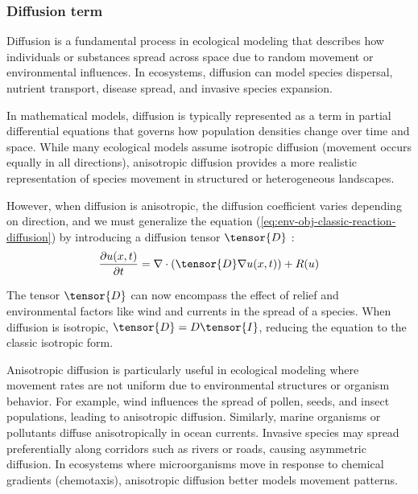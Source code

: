 \subsubsection{Diffusion term}
Diffusion is a fundamental process in ecological modeling that describes how individuals or substances spread across space due to random movement or environmental influences. In ecosystems, diffusion can model species dispersal, nutrient transport, disease spread, and invasive species expansion.

In mathematical models, diffusion is typically represented as a term in partial differential equations that governs how population densities change over time and space. While many ecological models assume isotropic diffusion (movement occurs equally in all directions), anisotropic diffusion provides a more realistic representation of species movement in structured or heterogeneous landscapes.

However, when diffusion is anisotropic, the diffusion coefficient varies depending on direction, and we must generalize the equation (\cref{eq:env-obj-classic-reaction-diffusion}) by introducing a diffusion tensor $\tensor{D}$ \cite{Ramos2024}:
\begin{align}
    \label{eq:env-obj-reaction-diffusion}
    \frac{\partial u (x, t)}{\partial t} = \nabla \cdot (\tensor{D} \nabla u(x, t)) + R(u)
\end{align}

The tensor $\tensor{D}$ can now encompass the effect of relief and environmental factors like wind and currents in the spread of a species. When diffusion is isotropic, $\tensor{D} = D\tensor{I}$, reducing the equation to the classic isotropic form.

Anisotropic diffusion is particularly useful in ecological modeling where movement rates are not uniform due to environmental structures or organism behavior. For example, wind influences the spread of pollen, seeds, and insect populations, leading to anisotropic diffusion. Similarly, marine organisms or pollutants diffuse anisotropically in ocean currents.
Invasive species may spread preferentially along corridors such as rivers or roads, causing asymmetric diffusion. In ecosystems where microorganisms move in response to chemical gradients (chemotaxis), anisotropic diffusion better models movement patterns.


